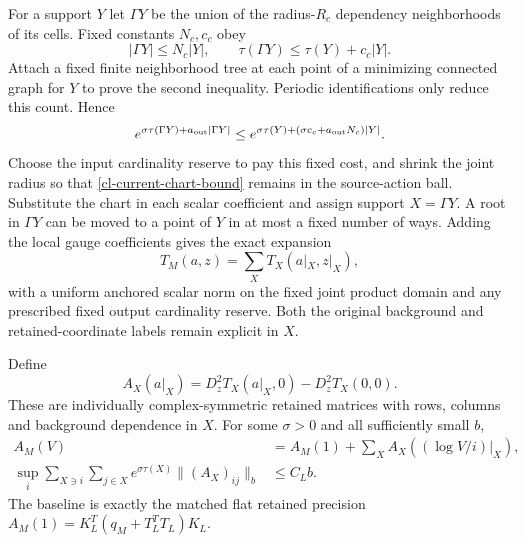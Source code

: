 For a support $Y$ let $\Gamma Y$ be the union of the radius-$R_c$
dependency neighborhoods of its cells. Fixed constants $N_c,c_c$ obey
\begin{equation}
 |\Gamma Y|\le N_c|Y|,\qquad
 \tau(\Gamma Y)\le\tau(Y)+c_c|Y|.                           \label{cl-support-enlargement}
\end{equation}
Attach a fixed finite neighborhood tree at each point of a minimizing
connected graph for $Y$ to prove the second inequality. Periodic
identifications only reduce this count. Hence
\begin{equation}
 e^{\sigma\tau(\Gamma Y)+a_{\rm out}|\Gamma Y|}
 \le e^{\sigma\tau(Y)+(\sigma c_c+a_{\rm out}N_c)|Y|}.       \label{cl-composition-weight}
\end{equation}
Choose the input cardinality reserve to pay this fixed cost, and shrink
the joint radius so that \eqref{cl-current-chart-bound} remains in the
source-action ball. Substitute the chart in each scalar coefficient and
assign support $X=\Gamma Y$. A root in $\Gamma Y$ can be moved to a
point of $Y$ in at most a fixed number of ways. Adding the local gauge
coefficients gives the exact expansion
\begin{equation}
 T_M(a,z)=\sum_X T_X(a|_X,z|_X),                             \label{cl-pulled-support-expansion}
\end{equation}
with a uniform anchored scalar norm on the fixed joint product domain
and any prescribed fixed output cardinality reserve. Both the original
background and retained-coordinate labels remain explicit in $X$.

\begin{corollary}
\label{cl-precision-theorem}
Define
\begin{equation}
 A_X(a|_X)=D_z^2T_X(a|_X,0)-D_z^2T_X(0,0).                   \label{cl-precision-coefficients}
\end{equation}
These are individually complex-symmetric retained matrices with rows,
columns and background dependence in $X$. For some $\sigma>0$ and all
sufficiently small $b$,
\begin{align}
 A_M(V)&=A_M(1)+\sum_X A_X((\log V/i)|_X),                  \label{cl-precision-expansion}\\
 \sup_i\sum_{X\ni i}\sum_{j\in X}
 e^{\sigma\tau(X)}\|(A_X)_{ij}\|_b&\le C_L b.             \label{cl-precision-norm}
\end{align}
The baseline is exactly the matched flat retained precision
$A_M(1)=K_L^T(q_M+T_L^TT_L)K_L$.
\end{corollary}

